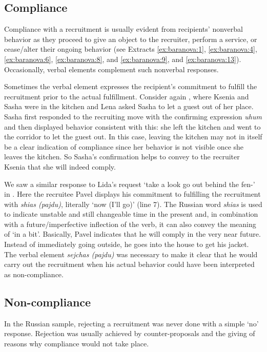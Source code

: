 \documentclass[output=paper,modfonts,nonflat]{langsci/langscibook}
\begin{document}
\subsection{Compliance}

Compliance with a recruitment is usually evident from recipients’ nonverbal behavior as they proceed to give an object to the recruiter, perform a service, or cease/alter their ongoing behavior (see Extracts \ref{ex:baranova:1}, \ref{ex:baranova:4}, \ref{ex:baranova:6}, \ref{ex:baranova:8}, and \ref{ex:baranova:9}, and \ref{ex:baranova:13}). Occasionally, verbal elements complement such nonverbal responses.

Sometimes the verbal element expresses the recipient's commitment to fulfill the recruitment prior to the actual fulfillment. Consider again , where Ksenia and Sasha were in the kitchen and Lena asked Sasha to let a guest out of her place. Sasha first responded to the recruiting move with the confirming expression \textit{uhum} and then displayed behavior consistent with this: she left the kitchen and went to the corridor to let the guest out. In this case, leaving the kitchen may not in itself be a clear indication of compliance since her behavior is not visible once she leaves the kitchen. So Sasha’s confirmation helps to convey to the recruiter Ksenia that she will indeed comply.

We saw a similar response to Lida's request ‘take a look go out behind the fen-’ in . Here the recruitee Pavel displays his commitment to fulfilling the recruitment with \textit{shias (pajdu)}, literally ‘now (I'll go)’ (line 7). The Russian word \textit{shias} is used to indicate unstable and still changeable time in the present and, in combination with a future/imperfective inflection of the verb, it can also convey the meaning of ‘in a bit’. Basically, Pavel indicates that he will comply in the very near future. Instead of immediately going outside, he goes into the house to get his jacket. The verbal element \textit{sejchas (pajdu)} was necessary to make it clear that he would carry out the recruitment when his actual behavior could have been interpreted as non-compliance.

\subsection{Non-compliance}

In the Russian sample, rejecting a recruitment was never done with a simple ‘no’ response. Rejection was usually achieved by counter-proposals and the giving of reasons why compliance would not take place.
\end{document}
